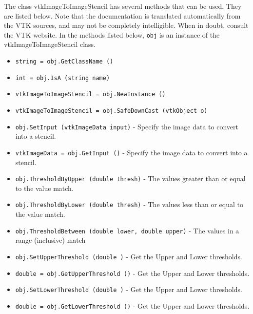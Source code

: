 The class vtkImageToImageStencil has several methods that can be used.
  They are listed below.
Note that the documentation is translated automatically from the VTK sources,
and may not be completely intelligible.  When in doubt, consult the VTK website.
In the methods listed below, \verb|obj| is an instance of the vtkImageToImageStencil class.
\begin{itemize}
\item  \verb|string = obj.GetClassName ()|

\item  \verb|int = obj.IsA (string name)|

\item  \verb|vtkImageToImageStencil = obj.NewInstance ()|

\item  \verb|vtkImageToImageStencil = obj.SafeDownCast (vtkObject o)|

\item  \verb|obj.SetInput (vtkImageData input)| -  Specify the image data to convert into a stencil.

\item  \verb|vtkImageData = obj.GetInput ()| -  Specify the image data to convert into a stencil.

\item  \verb|obj.ThresholdByUpper (double thresh)| -  The values greater than or equal to the value match.

\item  \verb|obj.ThresholdByLower (double thresh)| -  The values less than or equal to the value match.

\item  \verb|obj.ThresholdBetween (double lower, double upper)| -  The values in a range (inclusive) match

\item  \verb|obj.SetUpperThreshold (double )| -  Get the Upper and Lower thresholds.

\item  \verb|double = obj.GetUpperThreshold ()| -  Get the Upper and Lower thresholds.

\item  \verb|obj.SetLowerThreshold (double )| -  Get the Upper and Lower thresholds.

\item  \verb|double = obj.GetLowerThreshold ()| -  Get the Upper and Lower thresholds.

\end{itemize}

